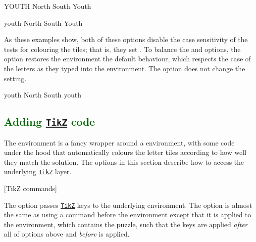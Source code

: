 \documentclass[svgnames]{report}
\newcommand\ctan[1]{\href{https://www.ctan.org/pkg/#1}{\texttt{#1}}}
\newcommand\Section[1]{\subsection{\textcolor{DarkGreen}{#1}}}
\begin{document}
  \begin{example}
  \begin{wordle}{YOUTH}
    North
    South
    Youth
  \end{wordle}
  \end{example}

  \begin{example}
  \begin{wordle}{youth}
    North
    South
    Youth
  \end{wordle}
  \end{example}

  As these examples show, both of these options disable the case
  sensitivity of the tests for colouring the  tiles;
  that is, they set .  To balance the
   and  options, the
   option restores the  environment
  the default behaviour, which respects the case of the letters
  as they typed into the environment. The  option does
  not change the  setting.

  \begin{example}
  \begin{wordle}{youth} %
    North
    South
    youth
  \end{wordle}
  \end{example}

  \Section{Adding \ctan{TikZ} code}

  The  environment is a fancy wrapper around a
   environment, with some code under the hood that
  automatically colours the letter tiles according to how well they
  match the solution. The options in this section describe how to access
  the underlying \ctan{TikZ} layer.

  [TikZ commands]

  The  option passes \ctan{TikZ} keys to the underlying
   environment. The  option is almost
  the same as using a \keyword{\tikzset{...}} command before the
   environment except that it is applied to the
   environment, which contains the 
  puzzle, such that the  keys are applied \textit{after}
  all of options above and \textit{before}  is
  applied.
\end{document}
